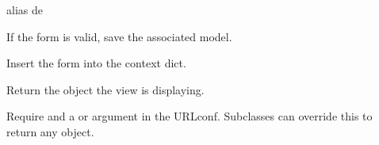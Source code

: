 \documentclass[letterpaper,10pt,spanish]{sphinxmanual}
\begin{document}
\begin{fulllineitems}

\pysigstartsignatures
{}
\pysigstopsignatures

\begin{fulllineitems}

\pysigstartsignatures
{}
\pysigstopsignatures
\sphinxAtStartPar
alias de 

\end{fulllineitems}



\begin{fulllineitems}

\pysigstartsignatures
{}
\pysigstopsignatures
\sphinxAtStartPar
If the form is valid, save the associated model.

\end{fulllineitems}



\begin{fulllineitems}

\pysigstartsignatures
{}
\pysigstopsignatures
\sphinxAtStartPar
Insert the form into the context dict.

\end{fulllineitems}



\begin{fulllineitems}

\pysigstartsignatures
{}
\pysigstopsignatures
\sphinxAtStartPar
Return the object the view is displaying.

\sphinxAtStartPar
Require  and a  or  argument in the URLconf.
Subclasses can override this to return any object.

\end{fulllineitems}




\end{fulllineitems}
\end{document}
